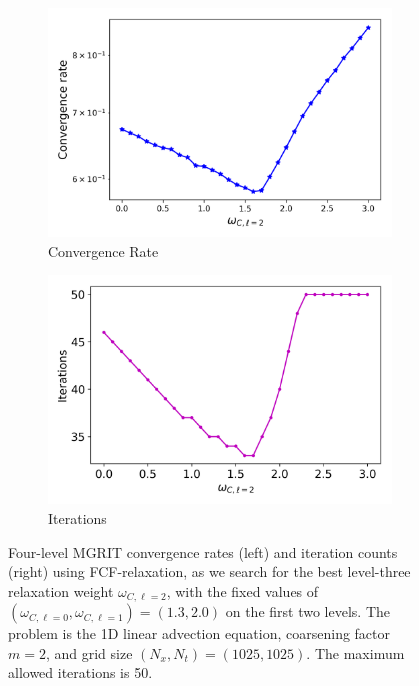 \documentclass[VANCOUVER,STIX1COL]{WileyNJD-v2}
\begin{document}
\begin{figure}[h!]
    \centering
    \begin{subfigure}[b]{0.4\textwidth}
    \includegraphics[width=\textwidth]{images/Advc1D_C_FourLevel_Conv.png}
    \caption{\normalsize Convergence Rate}
    \end{subfigure}
     \begin{subfigure}[b]{0.4\textwidth}
    \includegraphics[width=\textwidth]{images/Advc1D_C_FourLevel_Iter.png}
    \caption{\normalsize Iterations}
    \end{subfigure}
    \caption{Four-level MGRIT convergence rates (left) and iteration counts (right) using FCF-relaxation, as we search 
    for the best level-three relaxation weight $\omega_{C,\ell=2}$, with the fixed values of $(\omega_{C,\ell=0}, \omega_{C,\ell=1})=(1.3, 2.0)$ on the first two levels. The problem is the 1D linear advection equation, coarsening factor $m=2$, and grid size $(N_x, N_t) = (1025, 1025)$. The maximum allowed iterations is 50.}
    \label{fig: Advc1D_C Multilevel Weight Four-level}
\end{figure}
\end{document}
